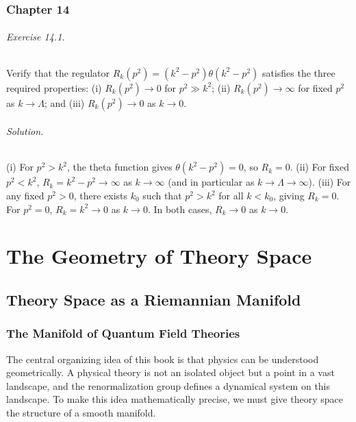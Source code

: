 \documentclass[11pt, twoside, openright]{book}
\theoremstyle{dotted}
\theoremstyle{definition}
\begin{document}
\section*{Chapter 14}

\paragraph{Exercise 14.1.} Verify that the regulator $R_k(p^2) = (k^2-p^2)\theta(k^2-p^2)$
satisfies the three required properties: (i) $R_k(p^2) \to 0$ for $p^2 \gg k^2$;
(ii) $R_k(p^2) \to \infty$ for fixed $p^2$ as $k \to \Lambda$; and
(iii) $R_k(p^2) \to 0$ as $k \to 0$.

\paragraph{Solution.} (i) For $p^2 > k^2$, the theta function gives $\theta(k^2-p^2)
= 0$, so $R_k = 0$. (ii) For fixed $p^2 < k^2$, $R_k = k^2 - p^2 \to \infty$ as
$k \to \infty$ (and in particular as $k \to \Lambda \to \infty$). (iii) For any
fixed $p^2 > 0$, there exists $k_0$ such that $p^2 > k^2$ for all $k < k_0$, giving
$R_k = 0$. For $p^2 = 0$, $R_k = k^2 \to 0$ as $k \to 0$. In both cases,
$R_k \to 0$ as $k \to 0$.

\part{The Geometry of Theory Space}

\chapter{Theory Space as a Riemannian Manifold}
\label{ch:ts_manifold}

\section{The Manifold of Quantum Field Theories}

The central organizing idea of this book is that physics can be understood
geometrically. A physical theory is not an isolated object but a point in a
vast landscape, and the renormalization group defines a dynamical system on
this landscape. To make this idea mathematically precise, we must give theory
space the structure of a smooth manifold.
\end{document}
